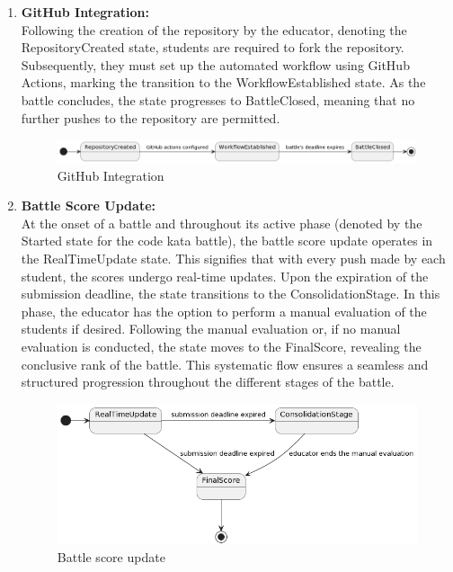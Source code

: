 \begin{enumerate}
    \item \textbf{GitHub Integration:} \\
    Following the creation of the repository by the educator, denoting the RepositoryCreated state, students are required to fork the repository. Subsequently, they must set up the automated workflow using GitHub Actions, marking the transition to the WorkflowEstablished state. As the battle concludes, the state progresses to BattleClosed, meaning that no further pushes to the repository are permitted.
        \begin{figure}[H]
              \centering
              \includegraphics[width=1\textwidth]{Images/SC_GitHubConfiguration.png}
              \caption{GitHub Integration}
              \label{fig:CKBLifecycle}
        \end{figure}
    

    \item \textbf{Battle Score Update:} \\
    At the onset of a battle and throughout its active phase (denoted by the Started state for the code kata battle), the battle score update operates in the RealTimeUpdate state. This signifies that with every push made by each student, the scores undergo real-time updates. Upon the expiration of the submission deadline, the state transitions to the ConsolidationStage. In this phase, the educator has the option to perform a manual evaluation of the students if desired. Following the manual evaluation or, if no manual evaluation is conducted, the state moves to the FinalScore, revealing the conclusive rank of the battle. This systematic flow ensures a seamless and structured progression throughout the different stages of the battle.
        \begin{figure}[H]
              \centering
              \includegraphics[width=1\textwidth]{Images/SC_BattleScoreUpdate.png}
              \caption{Battle score update}
              \label{fig:CKBLifecycle}
        \end{figure}
    
\end{enumerate}

